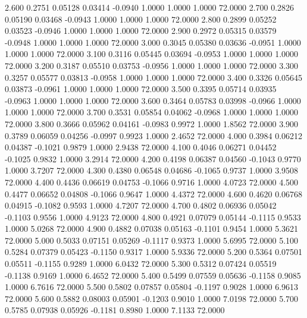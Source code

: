    2.600   0.2751   0.05128   0.03414  -0.0940   1.0000   1.0000   1.0000  72.0000
   2.700   0.2826   0.05190   0.03468  -0.0943   1.0000   1.0000   1.0000  72.0000
   2.800   0.2899   0.05252   0.03523  -0.0946   1.0000   1.0000   1.0000  72.0000
   2.900   0.2972   0.05315   0.03579  -0.0948   1.0000   1.0000   1.0000  72.0000
   3.000   0.3045   0.05380   0.03636  -0.0951   1.0000   1.0000   1.0000  72.0000
   3.100   0.3116   0.05445   0.03694  -0.0953   1.0000   1.0000   1.0000  72.0000
   3.200   0.3187   0.05510   0.03753  -0.0956   1.0000   1.0000   1.0000  72.0000
   3.300   0.3257   0.05577   0.03813  -0.0958   1.0000   1.0000   1.0000  72.0000
   3.400   0.3326   0.05645   0.03873  -0.0961   1.0000   1.0000   1.0000  72.0000
   3.500   0.3395   0.05714   0.03935  -0.0963   1.0000   1.0000   1.0000  72.0000
   3.600   0.3464   0.05783   0.03998  -0.0966   1.0000   1.0000   1.0000  72.0000
   3.700   0.3531   0.05854   0.04062  -0.0968   1.0000   1.0000   1.0000  72.0000
   3.800   0.3666   0.05962   0.04161  -0.0983   0.9972   1.0000   1.8562  72.0000
   3.900   0.3789   0.06059   0.04256  -0.0997   0.9923   1.0000   2.4652  72.0000
   4.000   0.3984   0.06212   0.04387  -0.1021   0.9879   1.0000   2.9438  72.0000
   4.100   0.4046   0.06271   0.04452  -0.1025   0.9832   1.0000   3.2914  72.0000
   4.200   0.4198   0.06387   0.04560  -0.1043   0.9770   1.0000   3.7207  72.0000
   4.300   0.4380   0.06548   0.04686  -0.1065   0.9737   1.0000   3.9508  72.0000
   4.400   0.4436   0.06619   0.04753  -0.1066   0.9716   1.0000   4.0723  72.0000
   4.500   0.4477   0.06652   0.04808  -0.1066   0.9647   1.0000   4.4372  72.0000
   4.600   0.4620   0.06768   0.04915  -0.1082   0.9593   1.0000   4.7207  72.0000
   4.700   0.4802   0.06936   0.05042  -0.1103   0.9556   1.0000   4.9123  72.0000
   4.800   0.4921   0.07079   0.05144  -0.1115   0.9533   1.0000   5.0268  72.0000
   4.900   0.4882   0.07038   0.05163  -0.1101   0.9454   1.0000   5.3621  72.0000
   5.000   0.5033   0.07151   0.05269  -0.1117   0.9373   1.0000   5.6995  72.0000
   5.100   0.5284   0.07379   0.05423  -0.1150   0.9317   1.0000   5.9336  72.0000
   5.200   0.5364   0.07501   0.05511  -0.1155   0.9289   1.0000   6.0432  72.0000
   5.300   0.5312   0.07424   0.05519  -0.1138   0.9169   1.0000   6.4652  72.0000
   5.400   0.5499   0.07559   0.05636  -0.1158   0.9085   1.0000   6.7616  72.0000
   5.500   0.5802   0.07857   0.05804  -0.1197   0.9028   1.0000   6.9613  72.0000
   5.600   0.5882   0.08003   0.05901  -0.1203   0.9010   1.0000   7.0198  72.0000
   5.700   0.5785   0.07938   0.05926  -0.1181   0.8980   1.0000   7.1133  72.0000
